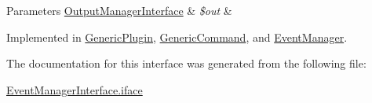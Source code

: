 \begin{DoxyParams}[1]{Parameters}
\hyperlink{interfaceOutputManagerInterface}{Output\-Manager\-Interface} & {\em \$out} & \\
\hline
\end{DoxyParams}


Implemented in \hyperlink{classGenericPlugin_a00fb20d417f3ad2f9839591a84348218}{Generic\-Plugin}, \hyperlink{classGenericCommand_aee43238a646b83c341ccb27b7d8e0978}{Generic\-Command}, and \hyperlink{classEventManager_ab75d670f0e0d69123495a08872126c13}{Event\-Manager}.



The documentation for this interface was generated from the following file\-:\begin{DoxyCompactItemize}
\item 
\hyperlink{EventManagerInterface_8iface}{Event\-Manager\-Interface.\-iface}\end{DoxyCompactItemize}
